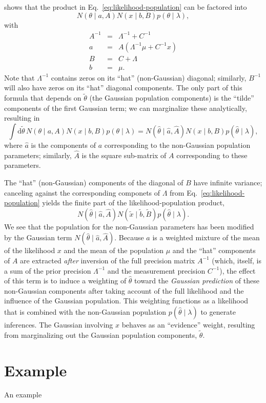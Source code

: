 \documentclass[modern]{aastex631}
\newcommand{\dd}{\mathrm{d}}
\begin{document}
\citet{Hogg2020} shows that the product in Eq.\ \eqref{eq:likelihood-population}
can be factored into 
\begin{equation}
    N\left( \theta \mid a, A \right) N\left( x \mid b, B \right) p\left( \theta \mid \lambda \right),
\end{equation}
with 
\begin{eqnarray}
    A^{-1} & = & \Lambda^{-1} + C^{-1} \\
    a & = & A \left( \Lambda^{-1} \mu + C^{-1} x \right) \\ 
    B & = & C + \Lambda \\
    b & = & \mu.
\end{eqnarray}
Note that $\Lambda^{-1}$ contains zeros on its ``hat'' (non-Gaussian) diagonal;
similarly, $B^{-1}$ will also have zeros on its ``hat'' diagonal components.
The only part of this formula that depends on $\tilde{\theta}$ (the Gaussian
population components) is the ``tilde'' components of the first Gaussian term;
we can marginalize these analytically, resulting in 
\begin{equation}
    \int \dd \tilde{\theta} \, N\left( \theta \mid a, A \right) N\left( x \mid b, B \right) p\left( \theta \mid \lambda \right) = N\left( \hat{\theta} \mid \hat{a}, \hat{A} \right) N\left( x \mid b, B \right) p\left( \hat{\theta} \mid \lambda \right),
\end{equation}
where $\hat{a}$ is the components of $a$ corresponding to the non-Gaussian
population parameters; similarly, $\hat{A}$ is the square sub-matrix of $A$
corresponding to these parameters.

The ``hat'' (non-Gaussian) components of the diagonal of $B$ have infinite
variance; canceling against the corresponding componets of $\Lambda$ from Eq.\
\eqref{eq:likelihood-population} yields the finite part of the
likelihood-population product, 
\begin{equation}
    N\left( \hat{\theta} \mid \hat{a}, \hat{A} \right) N\left( \tilde{x} \mid \tilde{b}, \tilde{B} \right) p\left( \hat{\theta} \mid \lambda \right).
\end{equation}
We see that the population for the non-Gaussian parameters has been modified by
the Gaussian term $N\left( \hat{\theta} \mid \hat{a}, \hat{A} \right)$.  Because
$a$ is a weighted mixture of the mean of the likelihood $x$ and the mean of the
population $\mu$ and the ``hat'' components of $A$ are extracted \emph{after}
inversion of the full precision matrix $A^{-1}$ (which, itself, is a sum of the
prior precision $\Lambda^{-1}$ and the measurement precision $C^{-1}$), the
effect of this term is to induce a weighting of $\hat{\theta}$ toward the
\emph{Gaussian prediction} of these non-Gaussian components after taking account
of the full likelihood and the influence of the Gaussian population.  This
weighting functions as a likelihood that is combined with the non-Gaussian
population $p\left( \hat{\theta} \mid \lambda \right)$ to generate inferences.
The Gaussian involving $x$ behaves as an ``evidence'' weight, resulting from
marginalizing out the Gaussian population components, $\tilde{\theta}$.  

\section{Example}
\label{sec:example}

An example 


\end{document}
